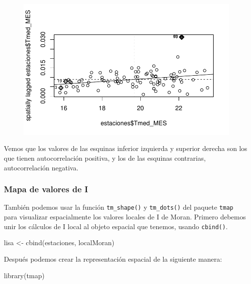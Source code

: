 \documentclass[
  letterpaper,
  DIV=11,
  numbers=noendperiod]{scrreprt}
\newenvironment{Shaded}{\begin{snugshade}}{\end{snugshade}}
\newcommand{\FunctionTok}[1]{\textcolor[rgb]{0.28,0.35,0.67}{#1}}
\newcommand{\NormalTok}[1]{\textcolor[rgb]{0.00,0.23,0.31}{#1}}
\newcommand{\OtherTok}[1]{\textcolor[rgb]{0.00,0.23,0.31}{#1}}
\begin{document}
\begin{figure}[H]

{\centering \includegraphics{04_AutocorrelacionEspacial_files/figure-pdf/unnamed-chunk-14-2.pdf}

}

\end{figure}

Vemos que los valores de las esquinas inferior izquierda y superior
derecha son los que tienen autocorrelación positiva, y los de las
esquinas contrarias, autocorrelación negativa.

\hypertarget{mapa-de-valores-de-i}{%
\subsubsection{Mapa de valores de I}\label{mapa-de-valores-de-i}}

También podemos usar la función \texttt{tm\_shape()} y
\texttt{tm\_dots()} del paquete \texttt{tmap} para visualizar
espacialmente los valores locales de I de Moran. Primero debemos unir
los cálculos de I local al objeto espacial que tenemos, usando
\texttt{cbind()}.

\begin{Shaded}
\begin{Highlighting}[]
\NormalTok{lisa }\OtherTok{\textless{}{-}} \FunctionTok{cbind}\NormalTok{(estaciones, localMoran)}
\end{Highlighting}
\end{Shaded}

Después podemos crear la representación espacial de la siguiente manera:

\begin{Shaded}
\begin{Highlighting}[]
\FunctionTok{library}\NormalTok{(tmap)}
\end{Highlighting}
\end{Shaded}
\end{document}
